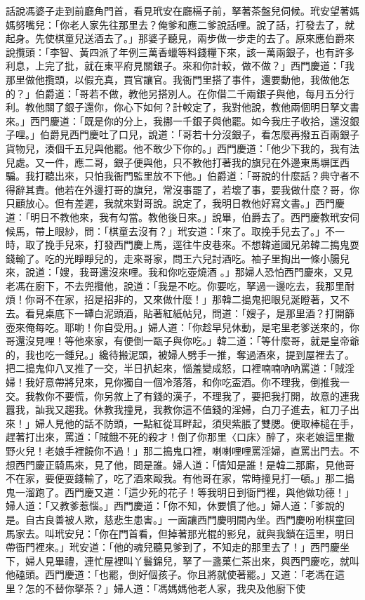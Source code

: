 \begin{showcontents}{}
話說馮婆子走到前廳角門首，看見玳安在廳槅子前，拏著茶盤兒伺候。玳安望著媽媽努嘴兒：「你老人家先往那里去？俺爹和應二爹說話哩。說了話，打發去了，就起身。先使棋童兒送酒去了。」那婆子聽見，兩步做一步走的去了。原來應伯爵來說攬頭：「李智、黃四派了年例三萬香蠟等料錢糧下來，該一萬兩銀子，也有許多利息，上完了批，就在東平府見關銀子。來和你計較，做不做？」西門慶道：「我那里做他攬頭，以假充真，買官讓官。我衙門里搭了事件，還要動他，我做他怎的？」伯爵道：「哥若不做，教他另搭別人。在你借二千兩銀子與他，每月五分行利。教他關了銀子還你，你心下如何？計較定了，我對他說，教他兩個明日拏文書來。」西門慶道：「既是你的分上，我挪一千銀子與他罷。如今我庄子收拾，還沒銀子哩。」伯爵見西門慶吐了口兒，說道：「哥若十分沒銀子，看怎麼再撥五百兩銀子貨物兒，湊個千五兒與他罷。他不敢少下你的。」西門慶道：「他少下我的，我有法兒處。又一件，應二哥，銀子便與他，只不教他打著我的旗兒在外邊東馬塀匡西騙。我打聽出來，只怕我衙門監里放不下他。」伯爵道：「哥說的什麼話？典守者不得辭其責。他若在外邊打哥的旗兒，常沒事罷了，若壞了事，要我做什麼？哥，你只顧放心。但有差遲，我就來對哥說。說定了，我明日教他好寫文書。」西門慶道：「明日不教他來，我有勾當。教他後日來。」說畢，伯爵去了。西門慶教玳安伺候馬，帶上眼紗，問：「棋童去沒有？」玳安道：「來了。取挽手兒去了。」不一時，取了挽手兒來，打發西門慶上馬，逕往牛皮巷來。不想韓道國兄弟韓二搗鬼耍錢輸了。吃的光睜睜兒的，走來哥家，問王六兒討酒吃。袖子里掏出一條小腸兒來，說道：「嫂，我哥還沒來哩。我和你吃壺燒酒 。」那婦人恐怕西門慶來，又見老馮在廚下，不去兜攬他，說道：「我是不吃。你要吃，拏過一邊吃去，我那里耐煩！你哥不在家，招是招非的，又來做什麼！」那韓二搗鬼把眼兒涎瞪著，又不去。看見桌底下一罈白泥頭酒，貼著紅紙帖兒，問道：「嫂子，是那里酒？打開篩壺來俺每吃。耶喲！你自受用。」婦人道：「你趁早兒休動，是宅里老爹送來的，你哥還沒見哩！等他來家，有便倒一甌子與你吃。」韓二道：「等什麼哥，就是皇帝爺的，我也吃一鍾兒。」纔待搬泥頭，被婦人劈手一推，奪過酒來，提到屋裡去了。把二搗鬼仰八叉推了一交，半日扒起來，惱羞變成怒，口裡喃喃吶吶罵道：「賊淫婦！我好意帶將兒來，見你獨自一個冷落落，和你吃盃酒。你不理我，倒推我一交。我教你不要慌，你另敘上了有錢的漢子，不理我了，要把我打開，故意的連我囂我，訕我又趨我。休教我撞見，我教你這不值錢的淫婦，白刀子進去，紅刀子出來！」婦人見他的話不防頭，一點紅從耳畔起，須臾紫脹了雙腮。便取棒槌在手，趕著打出來，罵道：「賊餓不死的殺才！倒了你那里〈口床〉醉了，來老娘這里撒野火兒！老娘手裡饒你不過！」那二搗鬼口裡，喇喇哩哩罵淫婦，直罵出門去。不想西門慶正騎馬來，見了他，問是誰。婦人道：「情知是誰！是韓二那廝，見他哥不在家，要便耍錢輸了，吃了酒來毆我。有他哥在家，常時撞見打一頓。」那二搗鬼一溜跑了。西門慶又道：「這少死的花子！等我明日到衙門裡，與他做功德！」婦人道：「又教爹惹惱。」西門慶道：「你不知，休要慣了他。」婦人道：「爹說的是。自古良善被人欺，慈悲生患害。」一面讓西門慶明間內坐。西門慶吩咐棋童回馬家去。叫玳安兒：「你在門首看，但掉著那光棍的影兒，就與我鎖在這里，明日帶衙門裡來。」玳安道：「他的魂兒聽見爹到了，不知走的那里去了！」西門慶坐下，婦人見畢禮，連忙屋裡叫丫鬟錦兒，拏了一盞菓仁茶出來，與西門慶吃，就叫他磕頭。西門慶道：「也罷，倒好個孩子。你且將就使著罷。」又道：「老馮在這里？怎的不替你拏茶？」婦人道：「馮媽媽他老人家，我央及他廚下使
\end{showcontents}
